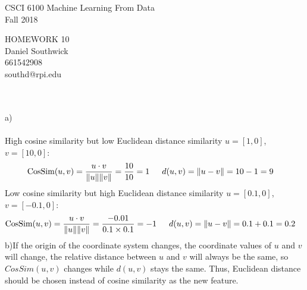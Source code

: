 \documentclass[12pt]{article}
\begin{document}
\begin{center}
CSCI 6100 Machine Learning From Data\\
Fall 2018\\
\end{center}
\begin{center}
HOMEWORK 10\\
Daniel Southwick\\
661542908\\
southd@rpi.edu
\end{center}
\vspace{.1in}

 \\\\
a)\\\\
\indent High cosine similarity but low Euclidean distance similarity $u = \left[ 1, 0 \right]$, $v = \left[ 10, 0 \right]$:\\
\begin{align*} 
\mbox{CosSim}( {u},  {v}) &= \frac{ {u}\cdot {v}}{\| {u}\|\| {v}\|} = \frac{10}{10} = 1 \indent
d( {u},  {v}) = \| {u}-  {v}\| = 10 - 1 = 9
\end{align*}
\indent Low cosine similarity but high Euclidean distance similarity $u = \left[ 0.1, 0 \right]$, $v = \left[ -0.1, 0 \right]$:\\
\begin{align*} 
\mbox{CosSim}( {u},  {v}) &= \frac{ {u}\cdot {v}}{\| {u}\|\| {v}\|} = \frac{-0.01}{0.1\times0.1} = -1  \indent
d( {u},  {v}) = \| {u}-  {v}\| = 0.1 + 0.1 = 0.2 
\end{align*}
b)\indent If the origin of the coordinate system changes, the coordinate values of $u$ and $v$ will change, the relative distance between $u$ and $v$ will always be the same, so $CosSim(u,v)$ changes while $d(u,v)$ stays the same. Thus, Euclidean distance 
should be chosen instead of cosine similarity as the new feature.\\\\
\end{document}
